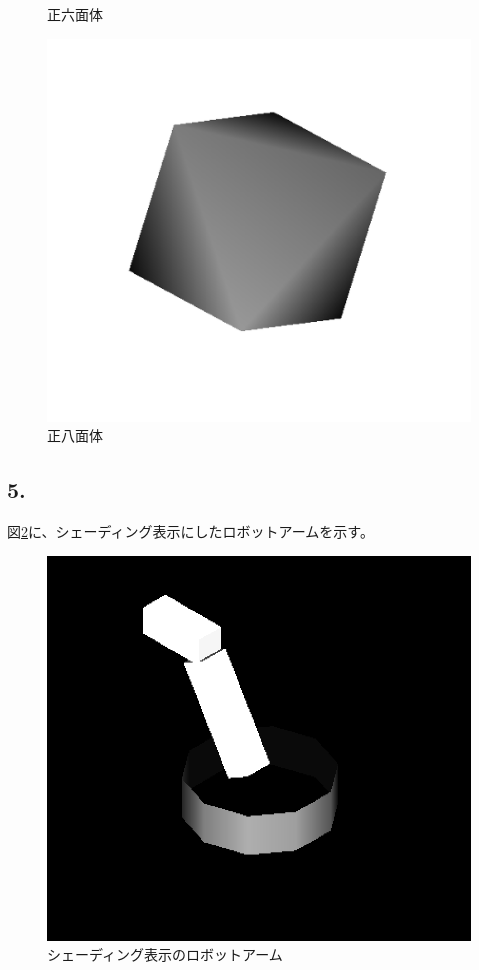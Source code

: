 \documentclass{jsarticle}
\begin{document}
\begin{figure}[h]
\begin{minipage}{0.33\hsize}
                \caption{正六面体}
                \label{fig:cube}
            \end{minipage}
            \begin{minipage}{0.33\hsize}
                \centering
                \includegraphics[width=1\hsize]{octahedron.png}
                \caption{正八面体}
                \label{fig:octahedron}
            \end{minipage}
        \end{figure}

    \subsection*{5.}
        図\ref{fig:real}に、シェーディング表示にしたロボットアームを示す。

        \begin{figure}[h]
            \centering
            \includegraphics[width=0.5\hsize]{real.png}
            \caption{シェーディング表示のロボットアーム}
            \label{fig:real}
        \end{figure}
\end{document}

